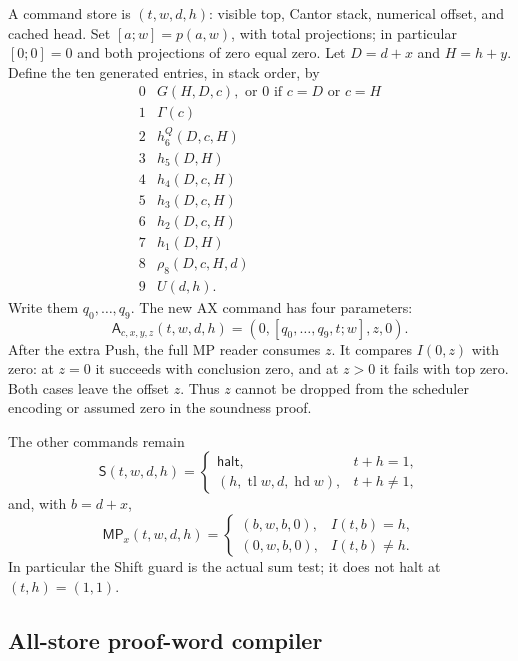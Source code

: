 A command store is $(t,w,d,h)$: visible top, Cantor stack, numerical
offset, and cached head. Set $[a;w]=p(a,w)$, with total projections;
in particular $[0;0]=0$ and both projections of zero equal zero.
Let $D=d+x$ and $H=h+y$. Define the ten generated entries, in stack
order, by
\[
\begin{array}{c|l}
0&G(H,D,c),\text{ or }0\text{ if }c=D\text{ or }c=H\\
1&\Gamma(c)\\
2&h_6^Q(D,c,H)\\
3&h_5(D,H)\\
4&h_4(D,c,H)\\
5&h_3(D,c,H)\\
6&h_2(D,c,H)\\
7&h_1(D,H)\\
8&\rho_8(D,c,H,d)\\
9&U(d,h).
\end{array}
\]
Write them $q_0,\ldots,q_9$. The new AX command has four parameters:
\[
 \mathsf A_{c,x,y,z}(t,w,d,h)
       =(0,[q_0,\ldots,q_9,t;w],z,0).                 \tag{2}
\]
After the extra Push, the full MP reader consumes $z$. It compares
$I(0,z)$ with zero: at $z=0$ it succeeds with conclusion zero, and
at $z>0$ it fails with top zero. Both cases leave the offset $z$.
Thus $z$ cannot be dropped from the scheduler encoding or assumed zero
in the soundness proof.

The other commands remain
\[
 \mathsf S(t,w,d,h)=
 \begin{cases}\mathsf{halt},&t+h=1,\\
 (h,\operatorname{tl}w,d,\operatorname{hd}w),&t+h\ne1,
 \end{cases}
\]
and, with $b=d+x$,
\[
 \mathsf{MP}_x(t,w,d,h)=
 \begin{cases}(b,w,b,0),&I(t,b)=h,\\
 (0,w,b,0),&I(t,b)\ne h.
 \end{cases}                                             \tag{3}
\]
In particular the Shift guard is the actual sum test; it does not halt
at $(t,h)=(1,1)$.

\subsection{All-store proof-word compiler}

